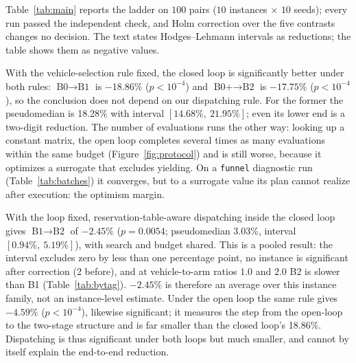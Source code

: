\documentclass[preprint,review,12pt,authoryear]{elsarticle}
\newcommand{\NCases}{10}
\newcommand{\NSeeds}{10}
\newcommand{\NPairs}{100}
\newcommand{\GainLoopRule}{18.86\%}      %
\newcommand{\PLoopRule}{<10^{-4}}
\newcommand{\GainLoopProbe}{17.75\%}     %
\newcommand{\PLoopProbe}{<10^{-4}}
\newcommand{\GainProbeOpen}{4.59\%}      %
\newcommand{\PProbeOpen}{<10^{-4}}
\newcommand{\GainProbeLoop}{2.45\%}      %
\newcommand{\PProbeLoop}{=0.0054}
\newcommand{\HLLoopRule}{18.28\%}
\newcommand{\CILoopRule}{$[14.68\%,\ 21.95\%]$}
\newcommand{\HLProbeLoop}{3.03\%}
\newcommand{\CIProbeLoop}{$[0.94\%,\ 5.19\%]$}
\newcommand{\CellsSigProbe}{2}
\begin{document}
Table~\ref{tab:main} reports the ladder on $\NPairs$ pairs ($\NCases$ instances $\times$ $\NSeeds$ seeds); every run passed the independent check, and Holm correction over the five contrasts changes no decision.
The text states Hodges--Lehmann intervals as reductions; the table shows them as negative values.

\begin{table}[!htbp]
\caption{Four-level ladder under an equal wall-clock budget, and the four one-factor contrasts. Negative is better.
$n=\NPairs$ pairs on $(\text{instance},\text{seed})$; two-sided Wilcoxon signed-rank, Holm-corrected over the five contrasts
($^{*}p<0.05$, $^{**}p<0.01$, $^{***}p<0.001$). HL: Hodges--Lehmann pseudomedian with $95\%$ interval.
Bold marks our configuration, not a per-instance winner.}
\label{tab:main}
\small

\end{table}

With the vehicle-selection rule fixed, the closed loop is significantly better under both rules: $\text{B0}\to\text{B1}$ is $-\GainLoopRule$ ($p\PLoopRule$) and $\text{B0+}\to\text{B2}$ is $-\GainLoopProbe$ ($p\PLoopProbe$), so the conclusion does not depend on our dispatching rule.
For the former the pseudomedian is \HLLoopRule{} with interval \CILoopRule{}; even its lower end is a two-digit reduction.
The number of evaluations runs the other way: looking up a constant matrix, the open loop completes several times as many evaluations within the same budget (Figure~\ref{fig:protocol}) and is still worse, because it optimizes a surrogate that excludes yielding.
On a \texttt{funnel} diagnostic run (Table~\ref{tab:batches}) it converges, but to a surrogate value its plan cannot realize after execution: the optimism margin.

With the loop fixed, reservation-table-aware dispatching inside the closed loop gives $\text{B1}\to\text{B2}$ of $-\GainProbeLoop$ ($p\PProbeLoop$; pseudomedian \HLProbeLoop{}, interval \CIProbeLoop{}), with search and budget shared.
This is a pooled result: the interval excludes zero by less than one percentage point, no instance is significant after correction (\CellsSigProbe{} before), and at vehicle-to-arm ratios $1.0$ and $2.0$ B2 is slower than B1 (Table~\ref{tab:bytag}).
$-\GainProbeLoop$ is therefore an average over this instance family, not an instance-level estimate.
Under the open loop the same rule gives $-\GainProbeOpen$ ($p\PProbeOpen$), likewise significant; it measures the step from the open-loop to the two-stage structure and is far smaller than the closed loop's \GainLoopRule{}.
Dispatching is thus significant under both loops but much smaller, and cannot by itself explain the end-to-end reduction.
\end{document}
